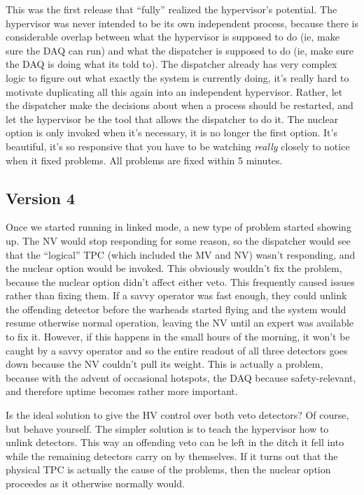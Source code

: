 This was the first release that ``fully'' realized the hypervisor's potential.
The hypervisor was never intended to be its own independent process, because there is considerable overlap between what the hypervisor is supposed to do (ie, make sure the DAQ can run) and what the dispatcher is supposed to do (ie, make sure the DAQ is doing what its told to).
The dispatcher already has very complex logic to figure out what exactly the system is currently doing, it's really hard to motivate duplicating all this again into an independent hypervisor.
Rather, let the dispatcher make the decisions about when a process should be restarted, and let the hypervisor be the tool that allows the dispatcher to do it.
The nuclear option is only invoked when it's necessary, it is no longer the first option.
It's beautiful, it's so responsive that you have to be watching \emph{really} closely to notice when it fixed problems.
All problems are fixed within 5 minutes.

\subsection{Version 4}

Once we started running in linked mode, a new type of problem started showing up.
The NV would stop responding for some reason, so the dispatcher would see that the ``logical'' TPC (which included the MV and NV) wasn't responding, and the nuclear option would be invoked.
This obviously wouldn't fix the problem, because the nuclear option didn't affect either veto.
This frequently caused issues rather than fixing them.
If a savvy operator was fast enough, they could unlink the offending detector before the warheads started flying and the system would resume otherwise normal operation, leaving the NV until an expert was available to fix it.
However, if this happens in the small hours of the morning, it won't be caught by a savvy operator and so the entire readout of all three detectors goes down because the NV couldn't pull its weight.
This is actually a problem, because with the advent of occasional hotspots, the DAQ because safety-relevant, and therefore uptime becomes rather more important.

Is the ideal solution to give the HV control over both veto detectors?
Of course, but behave yourself.
The simpler solution is to teach the hypervisor how to unlink detectors.
This way an offending veto can be left in the ditch it fell into while the remaining detectors carry on by themselves.
If it turns out that the physical TPC is actually the cause of the problems, then the nuclear option proceedes as it otherwise normally would.

